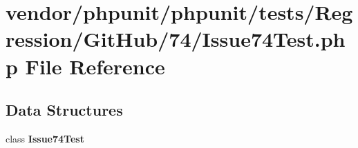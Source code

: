 \section{vendor/phpunit/phpunit/tests/\+Regression/\+Git\+Hub/74/\+Issue74\+Test.php File Reference}
\label{_issue74_test_8php}
\subsection*{Data Structures}
\begin{DoxyCompactItemize}
\item 
class {\bf Issue74\+Test}
\end{DoxyCompactItemize}
